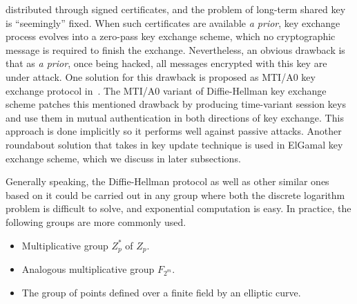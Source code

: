 \documentclass[12pt,journal,compsoc]{IEEEtran}
\begin{document}
distributed through signed certificates, and the problem of long-term
shared key is ``seemingly'' fixed. When such certificates are
available \emph{a prior}, key exchange process evolves into a
zero-pass key exchange scheme, which no cryptographic message is
required to finish the exchange. Nevertheless, an obvious drawback is
that as \emph{a prior}, once being hacked, all messages encrypted with
this key are under attack. One solution for this drawback is proposed
as MTI/A0 key exchange protocol in~\cite{ref:Matsumoto1986}. The
MTI/A0 variant of Diffie-Hellman key exchange scheme patches this
mentioned drawback by producing time-variant session keys and use them
in mutual authentication in both directions of key exchange. This
approach is done implicitly so it performs well against passive
attacks. Another roundabout solution that takes in key update
technique is used in ElGamal key exchange scheme, which we discuss in
later subsections.
\par
Generally speaking, the Diffie-Hellman protocol as well as other
similar ones based on it could be carried out in any group where both
the discrete logarithm problem is difficult to solve, and exponential
computation is easy. In practice, the following groups are more
commonly used.
\begin{itemize}
\item Multiplicative group $Z^{*}_{p}$ of $Z_{p}$.
\item Analogous multiplicative group $F_{2^{m}}$.
\item The group of points defined over a finite field by an elliptic curve.
\end{itemize}
\end{document}

